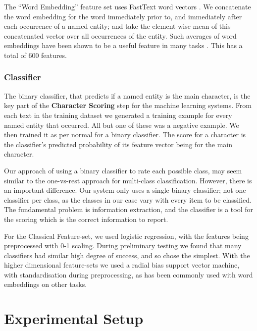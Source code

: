 \documentclass[11pt,a4paper]{article}
\newcommand{\parencite}{\citep}
\newcommand{\textcite}{\cite}
\begin{document}
The ``Word Embedding'' feature set uses FastText word vectors \parencite{bojanowski2016enriching}.
We concatenate the word embedding for the word immediately prior to, and immediately after each occurrence of a named entity;
and take the element-wise mean of this concatenated vector over all occurrences of the  entity.
Such averages of word embeddings have been shown to be a useful feature in many tasks \parencite{White2015SentVecMeaning,mikolovSkip}.
This has a total of 600 features.

\subsubsection{Classifier}
The binary classifier, that predicts if a named entity is the main character, is the key part of the \textbf{Character Scoring} step for the machine learning systems.
From each text in the training dataset
we generated a training example for every named entity that occurred.
All but one of these was a negative example.
We then trained it as per normal for a binary classifier.
The score for a character is the classifier's predicted probability of its feature vector being for the main character.

Our approach of using a binary classifier to rate each possible class,
may seem similar to the one-vs-rest approach for multi-class classification.
However, there is an important difference.
Our system only uses a single binary classifier; not one classifier per class,
as the classes in our case vary with every item to be classified.
The fundamental problem is information extraction, and the classifier is a tool for the scoring which is the correct information to report.


For the Classical Feature-set, we used logistic regression, with the features being preprocessed with 0-1 scaling.
During preliminary testing we found that many classifiers had similar high degree of success, and so chose the simplest.
With the higher dimensional feature-sets we used a radial bias support vector machine, with  standardisation during preprocessing,
as has been commonly used with word embeddings on other tasks.



\section{Experimental Setup}\label{sec:experimental-setup}
\end{document}
